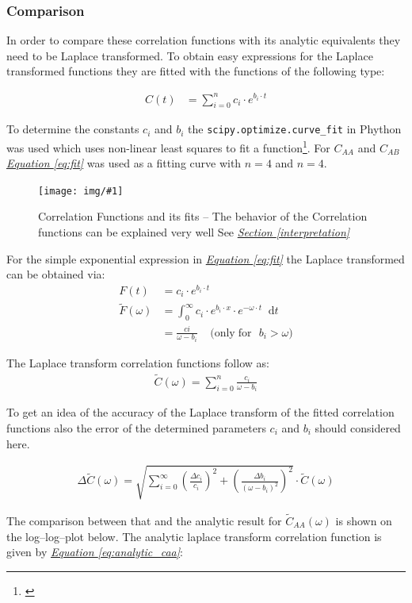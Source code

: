 \documentclass[a4paper, parskip=half]{scrartcl}
\newcommand{\myImage}[2]{
	\begin{figure}[H]
	\centering
	\texttt{[image: img/\#1]}
	\caption{#2}
	\label{pic:#1}
	\end{figure}
}
\newcommand{\diff}{\mathop{}\!\mathrm{d}}
\newcommand{\myEqRef}[1]{\textit{\hyperref[eq:#1]{Equation \ref*{eq:#1}}}}
\newcommand{\mySecRef}[1]{\textit{\hyperref[#1]{Section \ref*{#1}}}}
\newcommand{\myEqLabel}[1]{\label{eq:#1}}
\newcommand{\myCite}[1]{\footnote{\cite{#1} \citeauthor{#1} \citetitle{#1} \citeyear{#1}}}
\begin{document}
\subsubsection{Comparison}
In order to compare these correlation functions with its analytic equivalents they need to be Laplace transformed. To obtain easy expressions for the Laplace transformed functions they are fitted with the functions of the following type:

\begin{align}
C(t) &= \sum_{i=0}^{n} c_i \cdot e^{b_i \cdot t} \myEqLabel{fit}
\end{align}

To determine the constants $c_i$ and $b_i$ the \verb+scipy.optimize.curve_fit+ in Phython was used which uses non-linear least squares to fit a function\myCite{curvefit}. For $C_{AA}$ and $C_{AB}$ \myEqRef{fit} was used as a fitting curve with $n=4$ and $n = 4$.

\myImage{caa_cab}{Correlation Functions and its fits -- The behavior of the Correlation functions can be explained very well See \mySecRef{interpretation}}

For the simple exponential expression in \myEqRef{fit} the Laplace transformed can be obtained via:
\begin{align}
F(t) &= c_i \cdot e^{b_i \cdot t} \\
\widetilde{F}(\omega) &= \int_0^\infty c_i \cdot e^{b_i\cdot x} \cdot e^{-\omega\cdot t}\diff t \\
&= \frac{ci}{\omega - b_i}\;\;\;\; \mathrm{(only\; for\,\,\,\, } b_i > \omega \mathrm{)} \myEqLabel{laplace}
\end{align}

The Laplace transform correlation functions follow as:
\begin{align}
\widetilde{C}(\omega) = \sum_{i=0}^n \frac{c_i}{\omega - b_i}
\end{align}

To get an idea of the accuracy of the Laplace transform of the fitted correlation functions also the error of the determined parameters $c_i$ and $b_i$ should considered here.

\begin{align}
\Delta\widetilde{C}(\omega) = \sqrt{\sum_{i=0}^\infty \left(\frac{\Delta c_i}{c_i} \right)^2 + \left( \frac{\Delta b_i}{(\omega - b_i)^2}\right)^2} \cdot \widetilde{C}(\omega)
\end{align}

The comparison between that and the analytic result for $\widetilde{C}_{AA}(\omega)$ is shown on the log--log--plot below. The analytic laplace transform correlation function is given by \myEqRef{analytic_caa}:
\end{document}
